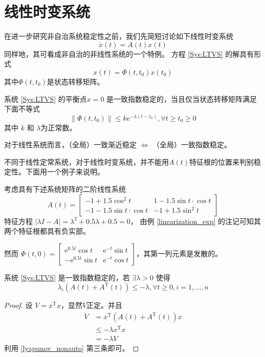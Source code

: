 \section{线性时变系统}\label{3Dref}
在进一步研究非自治系统稳定性之前，我们先简短讨论如下线性时变系统
\begin{equation}
  \dot{x}(t) = A (t) x(t) \label{Sys:LTVS}
\end{equation}
同样地，其可看成非自治的非线性系统的一个特例。
方程 \eqref{Sys:LTVS} 的解具有形式
\[ x (t) = \Phi (t, t_0) x (t_0) \]
其中$\Phi (t, t_0)$是状态转移矩阵。

\begin{theorem}
 系统 \eqref{Sys:LTVS} 的平衡点$x = 0$ 是一致指数稳定的，当且仅当状态转移矩阵满足下面不等式
  \[ \| \Phi (t, t_0) \| \leq k  \mathrm{e}^{- \lambda (t - t_0)}, \forall t \geq t_0
     \geq 0 \]
  其中 $k$ 和 $\lambda$为正常数。
\end{theorem}
\begin{note}
  对于线性系统而言，（全局）一致渐近稳定 $\iff$ （全局）一致指数稳定。
\end{note}
不同于线性定常系统，对于线性时变系统，并不能用$A (t)$特征根的位置来判别稳定性。下面用一个例子来说明。
\begin{example}
  考虑具有下述系统矩阵的二阶线性系统
  \[ A (t) = \left[\begin{array}{cc}
       - 1 + 1.5 \cos^2 t & 1 - 1.5 \sin  t \cdot \cos  t\\
       - 1 - 1.5 \sin  t \cdot \cos  t & - 1 + 1.5 \sin^2 t
     \end{array}\right] \]
 特征方程 $| \lambda I - A | = \lambda^2 + 0.5 \lambda + 0.5 = 0$，
 由例 \ref{linearization_exp} 的注记可知其两个特征根都具有负实部。
  
  然而 $\Phi (t, 0) = \left[\begin{array}{cc}
    \mathrm{e}^{0.5 t} \cos  t & \mathrm{e}^{- t} \sin  t\\
    -\mathrm{e}^{0.5 t} \sin  t & \mathrm{e}^{- t} \cos  t
  \end{array}\right]$，其第一列元素是发散的。
\end{example}

\begin{corollary}\label{ltvs_lambda}
  系统 \eqref{Sys:LTVS} 是一致指数稳定的，若 $\exists \lambda > 0$ 使得
  \[ \lambda_i (A (t) + A^\mathrm{T} (t)) \leq - \lambda, \forall t \geq 0, i = 1,
     \ldots, n \]
\end{corollary}
\begin{proof}
    设 $V = x^\mathrm{T} x$，显然$V$正定。并且
  \begin{align*}
    \dot{V} & =  x^\mathrm{T} (A (t) + A^\mathrm{T} (t)) x\\
    & \leq  - \lambda x^\mathrm{T} x\\
    & =  - \lambda V
  \end{align*}
  利用 \ref{lyapunov_nonauto} 第三条即可。
\end{proof}

